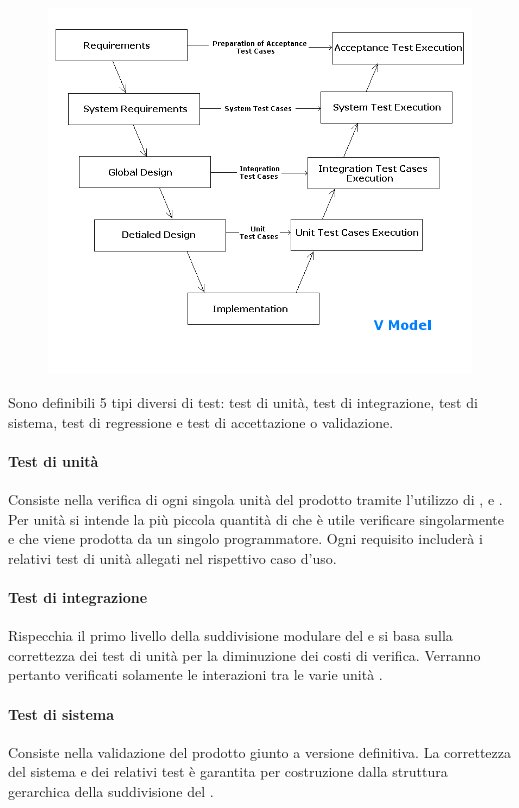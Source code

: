 \documentclass[12pt,a4paper]{article}
\begin{document}
		\begin{figure}[H]
			\centering
			\includegraphics[width=0.9\linewidth]{../img/v-model}
			\caption[V Model]{}
			\label{fig:v-model}
		\end{figure}
		
	Sono definibili 5 tipi diversi di test: test di unità, test di integrazione, test di sistema, test di regressione e test di accettazione o validazione.
	
	\paragraph{Test di unità}
	Consiste nella verifica di ogni singola unità del prodotto  tramite l'utilizzo di ,  e . Per unità si intende la più piccola quantità di  che è utile verificare singolarmente e che viene prodotta da un singolo programmatore. Ogni requisito includerà i relativi test di unità allegati nel rispettivo caso d'uso.
	
	\paragraph{Test di integrazione}
	Rispecchia il primo livello della suddivisione modulare del  e si basa sulla correttezza dei test di unità per la diminuzione dei costi di verifica. Verranno pertanto verificati solamente le interazioni tra le varie unità .
	
	\paragraph{Test di sistema}
	Consiste nella validazione del prodotto giunto a versione definitiva. La correttezza del sistema e dei relativi test è garantita per costruzione dalla struttura gerarchica della suddivisione del .
	
\end{document}
